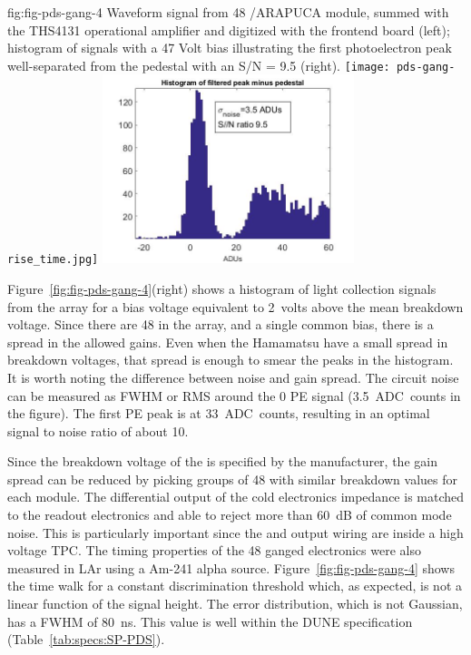 \begin{dunefigure}
 {fig:fig-pds-gang-4}
 {Waveform signal from 48 /ARAPUCA module, summed with the THS4131 operational amplifier and digitized with the  frontend board (left); histogram of signals with a 47 Volt bias illustrating the first photoelectron peak well-separated from the pedestal with an S/N = 9.5 (right).}
\texttt{[image: pds-gang-rise\_time.jpg]}
\includegraphics[height=5.5cm]{graphics/pds-gang48-47v.jpg}
\end{dunefigure}

Figure~\ref{fig:fig-pds-gang-4}(right) shows a histogram of light collection signals from the array for a bias voltage equivalent to \SI{2}{volts} above the mean breakdown voltage. Since there are 48  in the array, and a single common bias, there is a spread in the allowed gains. Even when the Hamamatsu  have a small spread in breakdown voltages, that spread is enough to smear the peaks in the histogram. It is worth noting the difference between noise and gain spread. The circuit noise can be measured as FWHM or RMS around the 0 PE signal (\SI{3.5}{ADC counts} in the figure). The first PE peak is at \SI{33}{ADC counts}, resulting in an optimal signal to noise ratio of about 10.

Since the breakdown voltage of the  is specified by the manufacturer, the gain spread can be reduced by picking groups of 48  with similar breakdown values for each module. The differential output of the cold electronics impedance is matched to the readout electronics and able to reject more than \SI{60}{dB} of common mode noise. This is particularly important since the  and output wiring are inside a high voltage TPC. The timing properties of the 48 ganged electronics were also measured 
in LAr using a Am-241 alpha source. 
Figure~\ref{fig:fig-pds-gang-4} shows the time walk for a constant discrimination threshold which, as expected, is not a linear function of the signal height. The error distribution, which is not Gaussian, has a FWHM of \SI{80}{ns}. This value is well within the DUNE specification (Table~\ref{tab:specs:SP-PDS}).

